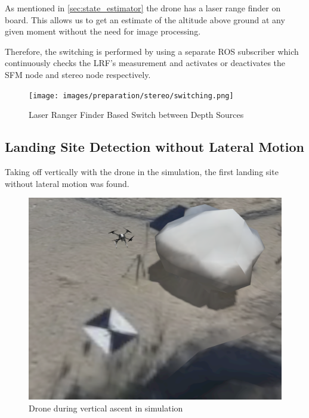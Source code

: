 As mentioned in \cref{sec:state_estimator} the drone has a laser range finder on board. This allows us to get an estimate of the altitude above ground at any given moment without the need for image processing.

Therefore, the switching is performed by using a separate ROS subscriber which continuously checks the LRF's measurement and activates or deactivates the SFM node and stereo node respectively.

\clearpage %
\begin{figure}
    \centering
    \texttt{[image: images/preparation/stereo/switching.png]}
    \caption{Laser Ranger Finder Based Switch between Depth Sources}
\end{figure}

\subsection{Landing Site Detection without Lateral Motion}

Taking off vertically with the drone in the simulation, the first landing site without lateral motion was found.

\begin{figure}
    \centering
    \includegraphics[scale=0.34]{images/preparation/stereo/ascent_sim.png}
    \caption{Drone during vertical ascent in simulation}
\end{figure}


